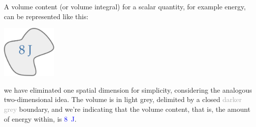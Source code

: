 \documentclass[a4paper,12pt,%
onecolumn,oneside,titlepage,%
british%
]{memoir}
\renewcommand*{\|}[1][]{\nonscript\:#1\vert\nonscript\:\mathopen{}}
\begin{document}
A volume content (or volume integral) for a scalar quantity, for example energy, can be represented like this:
\begin{center}
  \includegraphics[align=t,height=7em]{images/volumeintegral_8J.pdf}
\end{center}
we have eliminated one spatial dimension for simplicity, considering the analogous two-dimensional idea. The volume is in \textcolor{midgrey}{light grey}, delimited by a closed \textcolor{darkgrey}{darker grey} boundary, and we're indicating that the volume content, that is, the amount of energy within, is \textcolor{blue}{\qty{8}{J}}.
\end{document}
